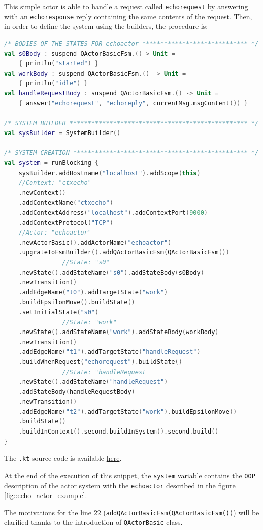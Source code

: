 This simple actor is able to handle a request called \texttt{echorequest} by answering with an \texttt{echoresponse} reply containing the same contents of the request.
Then, in order to define the system using the builders, the procedure is:


\begin{lstlisting}[caption={Example of builders use},label={lst::echoexample},language=kotlin]
/* BODIES OF THE STATES FOR echoactor ***************************** */
val s0Body : suspend QActorBasicFsm.()-> Unit =
	{ println("started") }
val workBody : suspend QActorBasicFsm.() -> Unit =
	{ println("idle") }
val handleRequestBody : suspend QActorBasicFsm.() -> Unit =
	{ answer("echorequest", "echoreply", currentMsg.msgContent()) }

/* SYSTEM BUILDER ************************************************* */
val sysBuilder = SystemBuilder()

/* SYSTEM CREATION ************************************************ */
val system = runBlocking {
	sysBuilder.addHostname("localhost").addScope(this)
	//Context: "ctxecho"
	.newContext()
	.addContextName("ctxecho")
	.addContextAddress("localhost").addContextPort(9000)
	.addContextProtocol("TCP")
	//Actor: "echoactor"
	.newActorBasic().addActorName("echoactor")
	.upgrateToFsmBuilder().addQActorBasicFsm(QActorBasicFsm())
				//State: "s0"
	.newState().addStateName("s0").addStateBody(s0Body)
	.newTransition()
	.addEdgeName("t0").addTargetState("work")
	.buildEpsilonMove().buildState()
	.setInitialState("s0")
				//State: "work"
	.newState().addStateName("work").addStateBody(workBody)
	.newTransition()
	.addEdgeName("t1").addTargetState("handleRequest")
	.buildWhenRequest("echorequest").buildState()
				//State: "handleRequest
	.newState().addStateName("handleRequest")
	.addStateBody(handleRequestBody)
	.newTransition()
	.addEdgeName("t2").addTargetState("work").buildEpsilonMove()
	.buildState()
	.buildInContext().second.buildInSystem().second.build()
}
\end{lstlisting}

The \texttt{.kt} source code is available \href{https://github.com/LM-96/QA-Extensions/blob/main/it.unibo.qakactor/src/main/kotlin/demo/EchoExample.kt}{here}.

At the end of the execution of this snippet, the \verb*|system| variable contains the \texttt{OOP} description of the actor system with the \texttt{echoactor} described in the figure \ref{fig::echo_actor_example}.

The motivations for the line $22$ (\verb*|addQActorBasicFsm(QActorBasicFsm())|) will be clarified thanks to the introduction of \texttt{QActorBasic} class.

